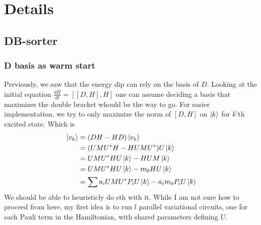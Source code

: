 \documentclass[11pt]{article}
\begin{document}
\section{Details}
\subsection{DB-sorter}
\subsubsection{D basis as warm start}
\label{sec:warm-start}
Previously, we saw that the energy dip can rely on the basis of $D$. Looking at the initial equation $\frac{dH}{dt} = [[D, H], H]$ one can assume deciding a basis that maximizes the double bracket whould be the way to go. For easier implementation, we try to only maximize the norm of $[D, H]$ on $\ket{k}$ for $k$'th excited state. Which is
\begin{align*}
    [D, H]\ket{v_k} &= (DH - HD)\ket{v_k} \\
    &= (UMU^*H - HUMU^*)U\ket{k} \\
    &= UMU^*HU\ket{k} - HUM\ket{k} \\
    &= UMU^*HU\ket{k} - m_0HU\ket{k} \\
    &= \sum{a_iUMU^*P_iU\ket{k} - a_im_0P_iU\ket{k}}
\end{align*}
We should be able to heuristicly do sth with it. While I am not sure how to proceed from here, my first idea is to run $l$ parallel variational circuits, one for each Pauli term in the Hamiltonian, with shared parameters defining $U$.
\end{document}

